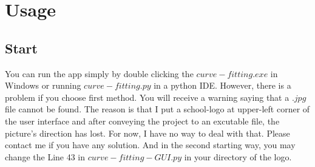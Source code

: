 \documentclass[a4paper]{ctexart}
\begin{document}
\section{Usage}
\subsection{Start}
You can run the app simply by double clicking the $curve-fitting.exe$ in Windows or running $curve-fitting.py$ in a python IDE. However, there is a problem if you choose first method. You will receive a warning saying that a $.jpg$ file cannot be found. The reason is that I put a school-logo at upper-left corner of the user interface and after conveying the project to an excutable file, the picture's direction has lost. For now, I have no way to deal with that. Please contact me if you have any solution. And in the second starting way, you may change the Line 43 in $curve-fitting-GUI.py$ in your directory of the logo.
\end{document}
